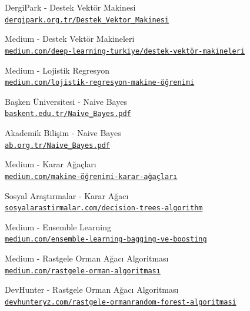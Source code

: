 \documentclass[conference]{IEEEtran}
\begin{document}
\begin{thebibliography}{23}
DergiPark - Destek Vektör Makinesi
\\\texttt{\href{https://dergipark.org.tr/tr/download/article-file/65371}{\nolinkurl{dergipark.org.tr/Destek_Vektor_Makinesi}}}

Medium - Destek Vektör Makineleri
\\\texttt{\href{https://medium.com/deep-learning-turkiye/nedir-bu-destek-vektör-makineleri-makine-öğrenmesi-serisi-2-94e576e4223e}{\nolinkurl{medium.com/deep-learning-turkiye/destek-vektör-makineleri}}}

Medium - Lojistik Regresyon
\\\texttt{\href{https://medium.com/@k.ulgen90/lojistik-regresyon-makine-öğrenimi-bölüm-7-c6bc685a4084}{\nolinkurl{medium.com/lojistik-regresyon-makine-öğrenimi}}}

Başken Üniversitesi - Naive Bayes
\\\texttt{\href{https://mail.baskent.edu.tr/~20410964/DM_9.pdf}{\nolinkurl{baskent.edu.tr/Naive_Bayes.pdf}}}

Akademik Bilişim - Naive Bayes
\\\texttt{\href{https://ab.org.tr/ab14/bildiri/186.pdf}{\nolinkurl{ab.org.tr/Naive_Bayes.pdf}}}

Medium - Karar Ağaçları
\\\texttt{\href{https://medium.com/@k.ulgen90/makine-öğrenimi-bölüm-5-karar-ağaçları-c90bd7593010}{\nolinkurl{medium.com/makine-öğrenimi-karar-ağaçları}}}

Sosyal Araştırmalar - Karar Ağacı
\\\texttt{\href{https://www.sosyalarastirmalar.com/articles/text-classification-via-decision-trees-algorithm-customer-comments-case.pdf}{\nolinkurl{sosyalarastirmalar.com/decision-trees-algorithm}}}

Medium - Ensemble Learning
\\\texttt{\href{https://medium.com/deep-learning-turkiye/ensemble-learning-bagging-ve-boosting-50643428b22b}{\nolinkurl{medium.com/ensemble-learning-bagging-ve-boosting}}}

Medium - Rastgele Orman Ağacı Algoritması
\\\texttt{\href{https://medium.com/@cemthecebi/rastgele-orman-algoritması-1600ca4f4784}{\nolinkurl{medium.com/rastgele-orman-algoritması}}}

DevHunter - Rastgele Orman Ağacı Algoritması
\\\texttt{\href{https://devhunteryz.wordpress.com/2018/09/20/rastgele-ormanrandom-forest-algoritmasi/comment-page-1}{\nolinkurl{devhunteryz.com/rastgele-ormanrandom-forest-algoritmasi}}}


\end{thebibliography}
\end{document}
